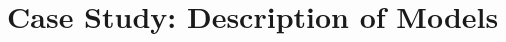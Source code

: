 \documentclass{article}
\begin{document}




\appendix
\section{Case Study: Description of Models}
\label{app:Description}


\end{document}
